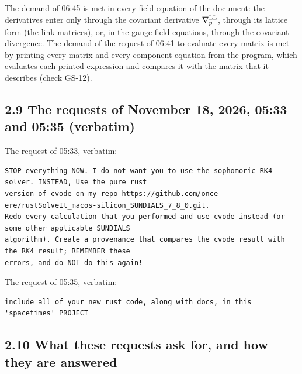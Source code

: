 \documentclass[
  10pt,
]{article}
\begin{document}
The demand of 06:45 is met in every field equation of the document: the
derivatives enter only through the covariant derivative
\(\nabla^{\rm LL}_p\), through its lattice form (the link matrices), or,
in the gauge-field equations, through the covariant divergence. The
demand of the request of 06:41 to evaluate every matrix is met by
printing every matrix and every component equation from the program,
which evaluates each printed expression and compares it with the matrix
that it describes (check GS-12).

\hypertarget{the-requests-of-november-18-2026-0533-and-0535-verbatim}{%
\subsection{2.9 The requests of November 18, 2026, 05:33 and 05:35
(verbatim)}\label{the-requests-of-november-18-2026-0533-and-0535-verbatim}}

The request of 05:33, verbatim:

\begin{verbatim}
STOP everything NOW. I do not want you to use the sophomoric RK4 solver. INSTEAD, Use the pure rust
version of cvode on my repo https://github.com/once-ere/rustSolveIt_macos-silicon_SUNDIALS_7_8_0.git.
Redo every calculation that you performed and use cvode instead (or some other applicable SUNDIALS
algorithm). Create a provenance that compares the cvode result with the RK4 result; REMEMBER these
errors, and do NOT do this again!
\end{verbatim}

The request of 05:35, verbatim:

\begin{verbatim}
include all of your new rust code, along with docs, in this 'spacetimes' PROJECT
\end{verbatim}

\hypertarget{what-these-requests-ask-for-and-how-they-are-answered-1}{%
\subsection{2.10 What these requests ask for, and how they are
answered}\label{what-these-requests-ask-for-and-how-they-are-answered-1}}
\end{document}

